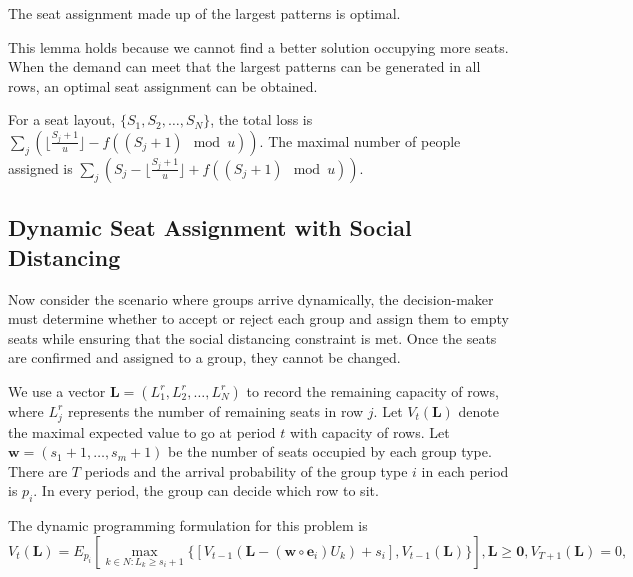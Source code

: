 \begin{lem}
The seat assignment made up of the largest patterns is optimal.
\end{lem}

This lemma holds because we cannot find a better solution occupying more seats. When the demand can meet that the largest patterns can be generated in all rows, an optimal seat assignment can be obtained.

\begin{prop}
For a seat layout, $\{S_1, S_2, \ldots, S_{N}\}$, the total loss is $\sum_{j} (\lfloor \frac{S_j+1}{u}  \rfloor - f((S_j +1)\mod u))$. The maximal number of people assigned is $\sum_{j} (S_j - \lfloor \frac{S_j+1}{u} \rfloor + f((S_j +1)\mod u))$.
\end{prop}

\subsection{Dynamic Seat Assignment with Social Distancing}


Now consider the scenario where groups arrive dynamically, the decision-maker must determine whether to accept or reject each group and assign them to empty seats while ensuring that the social distancing constraint is met. Once the seats are confirmed and assigned to a group, they cannot be changed.

We use a vector $\mathbf{L}= (L^{r}_1, L^{r}_2, \ldots, L^{r}_{N})$ to record the remaining capacity of rows, where $L^{r}_{j}$ represents the number of remaining seats in row $j$. Let $V_{t}(\mathbf{L})$ denote the maximal expected value to go at period $t$ with capacity of rows. Let $\mathbf{w} = (s_1+1, \ldots, s_m+1)$ be the number of seats occupied by each group type. There are $T$ periods and the arrival probability of the group type $i$ in each period is $p_i$. In every period, the group can decide which row to sit.

The dynamic programming formulation for this problem is
$$V_{t}(\mathbf{L}) = E_{p_i} \left[ \max_{k \in N: L_k \geq s_i +1} \{ {[V_{t-1}(\mathbf{L}- (\mathbf{w} \circ \mathbf{e}_{i})U_{k})+ s_i]}, {V_{t-1}(\mathbf{L})}\} \right], \mathbf{L} \geq \mathbf{0}, V_{T+1}(\mathbf{L}) = 0,$$

